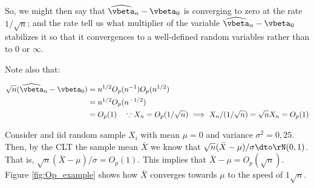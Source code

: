 \documentclass[english,12pt]{book}\usepackage[]{graphicx}\usepackage[]{xcolor}
\begin{document}
\begin{example}
So, we might then say that $\widehat{\vbeta}_n - \vbeta_0$ is converging to zero at the rate $1/\sqrt{n}$; and the rate tell us what multiplier of the variable $\widehat{\vbeta}_n - \vbeta_0$ stabilizes it so that it convergences to a well-defined random variables rather than to 0 or $\infty$. 

Note also that: 

\begin{equation*}
  \begin{aligned}
    \sqrt{n}(\widehat{\vbeta}_n - \vbeta_0) & =  n^{1/2}O_p(n^{-1})O_p(n^{1/2})\\
    & = n^{1/2} O_p(n^{-1/2}) \\
    & = O_p(1) \quad \because X_n = O_p(1/\sqrt{n}) \implies X_n / (1/\sqrt{n})= \sqrt{n} X_n = O_p(1) 
  \end{aligned}
\end{equation*}
\end{example}

\begin{example}
Consider and iid random sample $X_i$ with mean $\mu = 0$ and variance $\sigma^2 = 0,25$. Then, by the CLT the sample mean $\bar{X}$ we know that $\sqrt{n}(\bar{X}-\mu) /\sigma \dto \rN(0 , 1)$. That is, $\sqrt{n}(\bar{X}-\mu)/\sigma = O_p(1)$. This implies that $\bar{X} - \mu= O_p(\sqrt{n})$. Figure \ref{fig:Op_example} shows how $\bar{X}$ converges towards $\mu$ to the speed of $1\sqrt{n}$.
\end{example}
\end{document}

